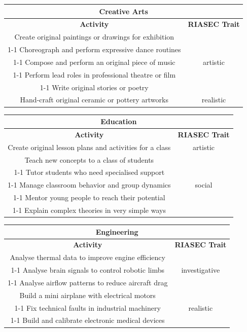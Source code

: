 \begin{table}[H]
\centering
\begin{tabular}{|c|c|}
\hline
\multicolumn{2}{|c|}{\textbf{Creative Arts}}\\
\hline
\hline
\textbf{Activity} & \textbf{RIASEC Trait}\\
\hline
Create original paintings or drawings for exhibition & \multirow{5}{*}{artistic}\\
\cline{1-1}
Choreograph and perform expressive dance routines & \\
\cline{1-1}
Compose and perform an original piece of music & \\
\cline{1-1}
Perform lead roles in professional theatre or film & \\
\cline{1-1}
Write original stories or poetry & \\
\hline
Hand-craft original ceramic or pottery artworks & realistic\\
\hline
\end{tabular}
\end{table}

\begin{table}[H]
\centering
\begin{tabular}{|c|c|}
\hline
\multicolumn{2}{|c|}{\textbf{Education}}\\
\hline
\hline
\textbf{Activity} & \textbf{RIASEC Trait}\\
\hline
Create original lesson plans and activities for a class & artistic\\
\hline
Teach new concepts to a class of students & \multirow{5}{*}{social}\\
\cline{1-1}
Tutor students who need specialised support & \\
\cline{1-1}
Manage classroom behavior and group dynamics & \\
\cline{1-1}
Mentor young people to reach their potential & \\
\cline{1-1}
Explain complex theories in very simple ways & \\
\hline
\end{tabular}
\end{table}

\begin{table}[H]
\centering
\begin{tabular}{|c|c|}
\hline
\multicolumn{2}{|c|}{\textbf{Engineering}}\\
\hline
\hline
\textbf{Activity} & \textbf{RIASEC Trait}\\
\hline
Analyse thermal data to improve engine efficiency & \multirow{3}{*}{investigative}\\
\cline{1-1}
Analyse brain signals to control robotic limbs & \\
\cline{1-1}
Analyse airflow patterns to reduce aircraft drag & \\
\hline
Build a mini airplane with electrical motors & \multirow{3}{*}{realistic}\\
\cline{1-1}
Fix technical faults in industrial machinery & \\
\cline{1-1}
Build and calibrate electronic medical devices & \\
\hline
\end{tabular}
\end{table}

